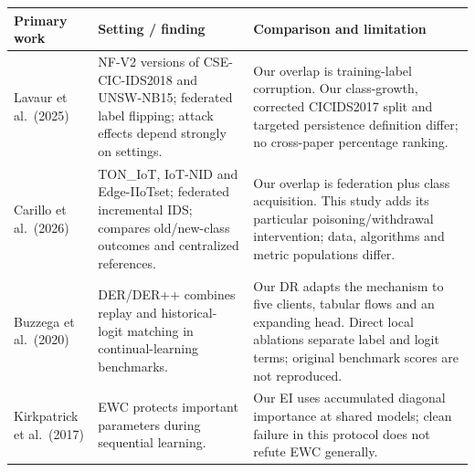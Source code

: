 \documentclass[
  10pt,
  a4paper,
]{article}
\begin{document}
\begin{longtable}[]{@{}
  >{\raggedright\arraybackslash}p{}
  >{\raggedright\arraybackslash}p{}
  >{\raggedright\arraybackslash}p{}@{}}
\toprule
Primary work & Setting / finding & Comparison and limitation \\
\midrule
\endhead
Lavaur et al.~(2025) \cite{lavaur} & NF-V2 versions of CSE-CIC-IDS2018 and
UNSW-NB15; federated label flipping; attack effects depend strongly on
settings. & Our overlap is training-label corruption. Our class-growth,
corrected CICIDS2017 split and targeted persistence definition differ;
no cross-paper percentage ranking. \\
Carillo et al.~(2026) \cite{carillo} & TON\_IoT, IoT-NID and Edge-IIoTset;
federated incremental IDS; compares old/new-class outcomes and
centralized references. & Our overlap is federation plus class
acquisition. This study adds its particular poisoning/withdrawal
intervention; data, algorithms and metric populations differ. \\
Buzzega et al.~(2020) \cite{der} & DER/DER++ combines replay and
historical-logit matching in continual-learning benchmarks. & Our DR
adapts the mechanism to five clients, tabular flows and an expanding
head. Direct local ablations separate label and logit terms; original
benchmark scores are not reproduced. \\
Kirkpatrick et al.~(2017) \cite{ewc} & EWC protects important parameters
during sequential learning. & Our EI uses accumulated diagonal
importance at shared models; clean failure in this protocol does not
refute EWC generally. \\
\bottomrule
\end{longtable}
\end{document}
